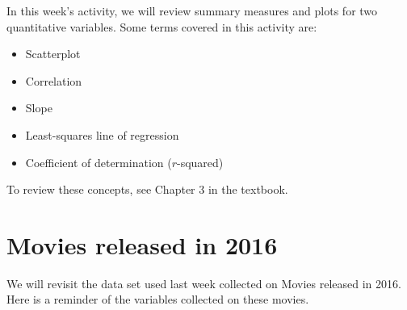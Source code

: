 \documentclass[
]{report}
\begin{document}
In this week's activity, we will review summary measures and plots for two quantitative variables. Some terms covered in this activity are:

\begin{itemize}
\item
  Scatterplot
\item
  Correlation
\item
  Slope
\item
  Least-squares line of regression
\item
  Coefficient of determination (\(r\)-squared)
\end{itemize}

To review these concepts, see Chapter 3 in the textbook.

\hypertarget{movies-released-in-2016}{%
\section{Movies released in 2016}\label{movies-released-in-2016}}

We will revisit the data set used last week collected on Movies released in 2016. Here is a reminder of the variables collected on these movies.
\end{document}
